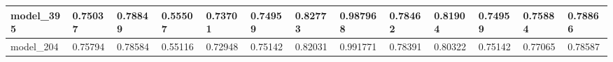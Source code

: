 \begin{tabular}{|l|l|l|l|l|l|l|l|l|l|l|l|l|}
model\_395     & 0.75037     & 0.78849        & 0.55507      & 0.73701          & 0.74959              & 0.82773              & 0.987968     & 0.78462           & 0.81904            & 0.74959         & 0.75884     & 0.78866      \\ \hline
model\_204     & 0.75794     & 0.78584        & 0.55116      & 0.72948          & 0.75142              & 0.82031              & 0.991771     & 0.78391           & 0.80322            & 0.75142         & 0.77065     & 0.78587      \\ \hline
\end{tabular}